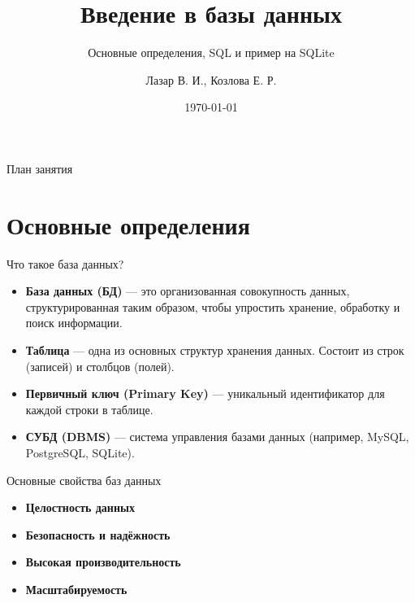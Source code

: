 \documentclass{beamer}
\title{Введение в базы данных}
\subtitle{Основные определения, SQL и пример на SQLite}
\author{Лазар В. И., Козлова Е. Р.}
\date{\today}
\begin{document}
\begin{frame}
	\titlepage
\end{frame}

\begin{frame}{План занятия}
	\tableofcontents
\end{frame}

\section{Основные определения}
\begin{frame}{Что такое база данных?}
	\begin{itemize}
		\item \textbf{База данных (БД)} --- это организованная совокупность данных,
		      структурированная таким образом, чтобы упростить хранение, обработку и поиск информации.
		\item \textbf{Таблица} --- одна из основных структур хранения данных.
		      Состоит из строк (записей) и столбцов (полей).
		\item \textbf{Первичный ключ (Primary Key)} --- уникальный идентификатор для каждой строки в таблице.
		\item \textbf{СУБД (DBMS)} --- система управления базами данных (например, MySQL, PostgreSQL, SQLite).
	\end{itemize}
\end{frame}

\begin{frame}{Основные свойства баз данных}
	\begin{itemize}
		\item \textbf{Целостность данных}
		\item \textbf{Безопасность и надёжность}
		\item \textbf{Высокая производительность}
		\item \textbf{Масштабируемость}
	\end{itemize}
\end{frame}

\end{document}
